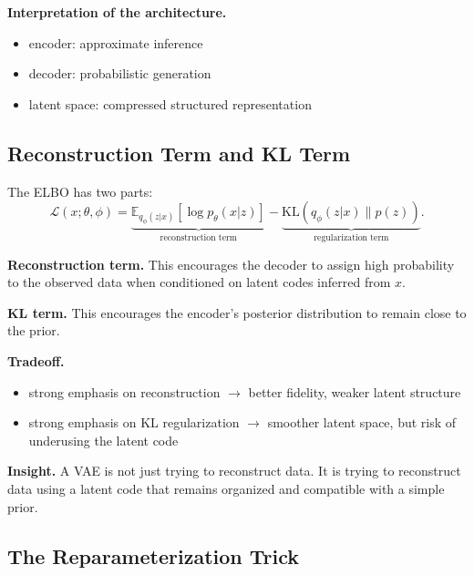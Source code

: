 \medskip

\noindent
\textbf{Interpretation of the architecture.}

\begin{itemize}
    \item encoder: approximate inference
    \item decoder: probabilistic generation
    \item latent space: compressed structured representation
\end{itemize}

\subsection{Reconstruction Term and KL Term}

The ELBO has two parts:
\[
\mathcal{L}(x;\theta,\phi)
=
\underbrace{\mathbb{E}_{q_\phi(z|x)}[\log p_\theta(x|z)]}_{\text{reconstruction term}}
-
\underbrace{\mathrm{KL}(q_\phi(z|x)\|p(z))}_{\text{regularization term}}.
\]

\medskip

\noindent
\textbf{Reconstruction term.}  
This encourages the decoder to assign high probability to the observed data when conditioned on latent codes inferred from $x$.

\medskip

\noindent
\textbf{KL term.}  
This encourages the encoder's posterior distribution to remain close to the prior.

\medskip

\noindent
\textbf{Tradeoff.}

\begin{itemize}
    \item strong emphasis on reconstruction $\rightarrow$ better fidelity, weaker latent structure
    \item strong emphasis on KL regularization $\rightarrow$ smoother latent space, but risk of underusing the latent code
\end{itemize}

\medskip

\noindent
\textbf{Insight.}  
A VAE is not just trying to reconstruct data. It is trying to reconstruct data using a latent code that remains organized and compatible with a simple prior.

\subsection{The Reparameterization Trick}

